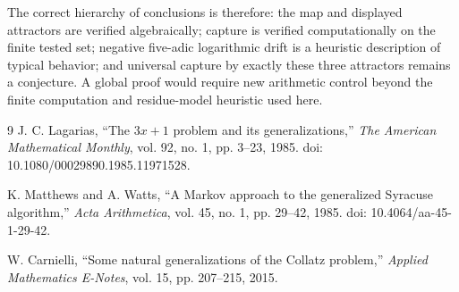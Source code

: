 \documentclass[11pt]{article}
\begin{document}
The correct hierarchy of conclusions is therefore: the map and displayed attractors are verified algebraically; capture is verified computationally on the finite tested set; negative five-adic logarithmic drift is a heuristic description of typical behavior; and universal capture by exactly these three attractors remains a conjecture. A global proof would require new arithmetic control beyond the finite computation and residue-model heuristic used here.

\begin{thebibliography}{9}
J. C. Lagarias, ``The $3x+1$ problem and its generalizations,'' \emph{The American Mathematical Monthly}, vol. 92, no. 1, pp. 3--23, 1985. doi: 10.1080/00029890.1985.11971528.

K. Matthews and A. Watts, ``A Markov approach to the generalized Syracuse algorithm,'' \emph{Acta Arithmetica}, vol. 45, no. 1, pp. 29--42, 1985. doi: 10.4064/aa-45-1-29-42.

W. Carnielli, ``Some natural generalizations of the Collatz problem,'' \emph{Applied Mathematics E-Notes}, vol. 15, pp. 207--215, 2015.
\end{thebibliography}
\end{document}
